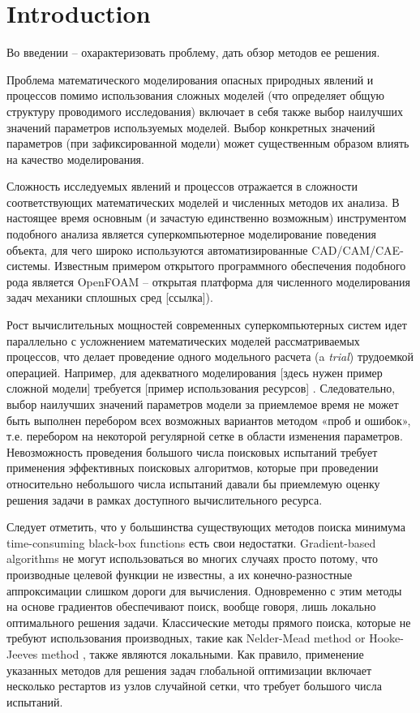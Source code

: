 \documentclass[sensors,article,submit,moreauthors,pdftex]{Definitions/mdpi}
\begin{document}
\section{Introduction}

Во введении -- охарактеризовать проблему, дать обзор методов ее решения.


Проблема математического моделирования опасных природных явлений и процессов помимо использования сложных моделей (что определяет общую структуру проводимого исследования) включает в себя также выбор наилучших значений параметров используемых моделей. Выбор конкретных значений параметров (при зафиксированной модели) может существенным образом влиять на качество моделирования. 

Сложность исследуемых явлений и процессов отражается в сложности соответствующих математических моделей и численных методов их анализа. В настоящее время основным (и зачастую единственно возможным) инструментом подобного анализа является суперкомпьютерное моделирование поведения объекта, для чего широко используются автоматизированные CAD/CAM/CAE-системы. Известным примером открытого программного обеспечения подобного рода является OpenFOAM -- открытая платформа для численного моделирования задач механики сплошных сред [ссылка]). 

Рост вычислительных мощностей современных суперкомпьютерных систем идет параллельно с усложнением математических моделей рассматриваемых процессов, что делает проведение одного модельного расчета (a \textit{trial}) трудоемкой операцией. Например, для адекватного моделирования [здесь нужен пример сложной модели] требуется [пример использования ресурсов] . Следовательно, выбор наилучших значений параметров модели за приемлемое время не может быть выполнен перебором всех возможных вариантов методом «проб и ошибок», т.е. перебором на некоторой регулярной сетке в области изменения параметров.
Невозможность проведения большого числа поисковых испытаний требует применения эффективных поисковых алгоритмов, которые при проведении относительно небольшого числа испытаний давали бы приемлемую оценку решения задачи в рамках доступного вычислительного ресурса.

Следует отметить, что у большинства существующих методов поиска минимума time-consuming black-box functions есть свои недостатки. Gradient-based algorithms не могут использоваться во многих случаях просто потому, что производные целевой функции не известны, а их конечно-разностные аппроксимации слишком дороги для вычисления. Одновременно с этим методы на основе градиентов обеспечивают поиск, вообще говоря, лишь локально оптимального решения задачи.
Классические методы прямого поиска, которые не требуют использования производных, такие как Nelder-Mead method \cite{NelderMead} or Hooke-Jeeves method \cite{HookJeeves}, также являются локальными. Как правило, применение указанных методов для решения задач глобальной оптимизации включает несколько рестартов из узлов случайной сетки, что требует большого числа испытаний. 
\end{document}
